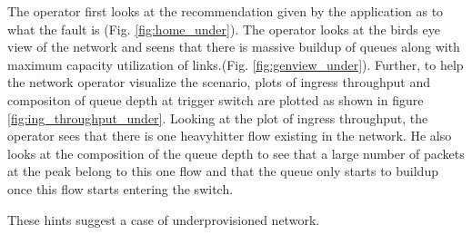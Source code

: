 The operator first looks at the recommendation given by the application as to what the fault is (Fig. \ref{fig:home_under}).
The operator looks at the birds eye view of the network and seens that there is massive buildup of queues along with maximum
capacity utilization of links.(Fig. \ref{fig:genview_under}).
Further, to help the network operator visualize the scenario, plots of ingress throughput and compositon of queue depth at 
trigger switch are plotted as shown in figure \ref{fig:ing_throughput_under}.
Looking at the plot of ingress throughput, the operator sees that there is one heavyhitter flow existing in the network.
He also looks at the composition of the queue depth to see that a large number of packets at the peak belong to this one flow and
that the queue only starts to buildup once this flow starts entering the switch.

These hints suggest a case of underprovisioned network.

